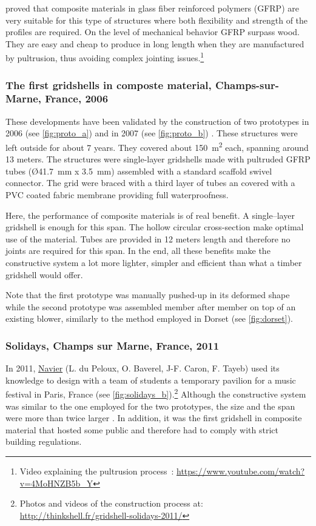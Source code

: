 \citet{Douthe2010a} proved that composite materials in glass fiber reinforced polymers (GFRP) are very suitable for this type of structures where both flexibility and strength of the profiles are required. On the level of mechanical behavior GFRP surpass wood. They are easy and cheap to produce in long length when they are manufactured by pultrusion, thus avoiding complex jointing issues.\footnote{Video explaining the pultrusion process~: \url{https://www.youtube.com/watch?v=4MoHNZB5b_Y}}

\subsubsection{The first gridshells in composte material, Champs-sur-Marne, France, 2006}
\label{sec:proto}
These developments have been validated by the construction of two prototypes in 2006 (see \cref{fig:proto_a}) and in 2007 (see \ref{fig:proto_b}) \cite{Douthe2006}. These structures were left outside for about 7 years. They covered about \SI{150}{m^2} each, spanning around 13 meters. The structures were single-layer gridshells made with pultruded GFRP tubes (\O \SI{41.7}{mm} x \SI{3.5}{mm}) assembled with a standard scaffold swivel connector. The grid were braced with a third layer of tubes an covered with a PVC coated fabric membrane providing full waterproofness.

Here, the performance of composite materials is of real benefit. A single--layer gridshell is enough for this span. The hollow circular cross-section make optimal use of the material. Tubes are provided in 12 meters length and therefore no joints are required for this span. In the end, all these benefits make the constructive system a lot more lighter, simpler and efficient than what a timber gridshell would offer.

Note that the first prototype was manually pushed-up in its deformed shape while the second prototype was assembled member after member on top of an existing blower, similarly to the method employed in Dorset (see \cref{fig:dorset}).

\subsubsection{Solidays, Champs sur Marne, France, 2011}
In 2011, \href{http://navier.enpc.fr}{Navier} (L. du Peloux, O. Baverel, J-F. Caron, F. Tayeb) used its knowledge to design with a team of students a temporary pavilion for a music festival in Paris, France (see \cref{fig:solidays_b}).\footnote{Photos and videos of the construction process at: \url{ http://thinkshell.fr/gridshell-solidays-2011/}} Although the constructive system was similar to the one employed for the two prototypes, the size and the span were more than twice larger \cite{Baverel2012}. In addition, it was the first gridshell in composite material that hosted some public and therefore had to comply with strict building regulations. 

